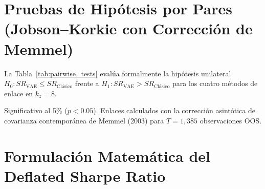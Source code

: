 \documentclass[11pt,a4paper]{article}
\begin{document}
\section{Pruebas de Hipótesis por Pares (Jobson--Korkie con Corrección de Memmel)}

La Tabla~\ref{tab:pairwise_tests} evalúa formalmente la hipótesis unilateral $H_0: SR_{\text{VAE}} \le SR_{\text{Clásico}}$ frente a $H_1: SR_{\text{VAE}} > SR_{\text{Clásico}}$ para los cuatro métodos de enlace en $k_z = 8$.

\begin{table}[H]
\centering
\small
\caption{\textbf{Contraste de hipótesis sobre la diferencia de Sharpe Ratios fuera de muestra ($k_z=8$)}}
\label{tab:pairwise_tests}
\vspace{0.15cm}
\parbox{\linewidth}{\footnotesize *Significativo al 5\% ($p < 0.05$). Enlaces calculados con la corrección asintótica de covarianza contemporánea de Memmel (2003) para $T = 1{,}385$ observaciones OOS.}
\end{table}

\section{Formulación Matemática del Deflated Sharpe Ratio}
\end{document}
